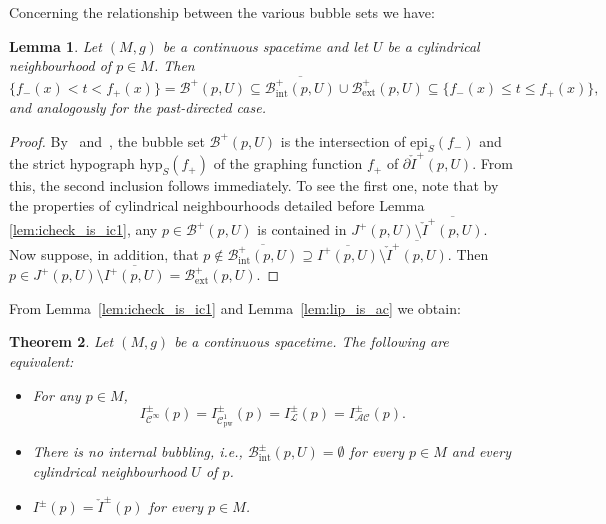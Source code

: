 \documentclass[reqno]{amsart}
\numberwithin{equation}{section}
\theoremstyle{plain}
\newtheorem{theorem}{Theorem}[section]
\newtheorem{lemma}[theorem]{Lemma}
\theoremstyle{definition}
\theoremstyle{remark}
\renewcommand\le{\leqslant}
\newcommand{\copw}{\mathcal{C}^1_{\mathrm{pw}}}
\newcommand{\sse}{\subseteq}
\begin{document}
Concerning the relationship between the various bubble sets we have:
\begin{lemma}\label{lem:bubble_inclusions}
Let $(M,g)$ be a continuous spacetime and let $U$ be a cylindrical neighbourhood of $p\in M$. 
Then 
\begin{equation}\label{eq:bubble_inclusion}
\{ f_-(x) < t <  f_+(x) \} = \mathcal{B}^+(p,U) \sse
\overline{\mathcal{B}^+_{\mathrm{int}}(p,U)} \cup \mathcal{B}^+_{\mathrm{ext}}(p,U) \sse \{ f_-(x) \le t \le f_+(x)\},
\end{equation}
and analogously for the past-directed case.
\end{lemma}
\begin{proof} By~\cite[Prop.\ 1.10]{CG:12} and~\cite[Prop.\ 1.21]{CG:12}, the bubble set $\mathcal{B}^+(p,U)$ is the 
intersection of $\mathrm{epi}_S(f_-)$ and the strict hypograph $\mathrm{hyp}_S(f_+)$ of the graphing function 
$f_+$ of $\partial \check I^+(p,U)$. From this, the second inclusion follows immediately. 
To see the first one, note that by the properties of cylindrical neighbourhoods detailed
before Lemma \ref{lem:icheck_is_ic1}, any $p\in \mathcal{B}^+(p,U)$ is contained
in $J^+(p,U)\setminus \overline{\check I^+(p,U)}$. Now suppose, in addition, that $p\not\in \overline{\mathcal{B}^+_{\mathrm{int}}(p,U)} \supseteq \overline{I^+(p,U)}\setminus
\overline{\check I^+(p,U)}$. Then $p\in J^+(p,U)\setminus \overline{I^+(p,U)} = \mathcal{B}^+_{\mathrm{ext}}(p,U)$.
\end{proof}

From Lemma~\ref{lem:icheck_is_ic1} and Lemma~\ref{lem:lip_is_ac} we obtain:
\begin{theorem}\label{thm:all_i_equal_for_causally_plain}
Let $(M,g)$ be a continuous spacetime. The following are equivalent:
\begin{itemize}
\item[(i)] For any $p\in M$, 
\[
I^\pm_{\mathcal{C}^\infty}(p) = I^\pm_{\copw}(p) = I^\pm_{\mathcal{L}}(p) =  I^\pm_{\mathcal{AC}}(p).
\]
\item[(ii)] There is no internal bubbling, i.e., $\mathcal{B}^{\pm}_{\mathrm{int}}(p,U)=\emptyset$ for every $p\in M$ and every 
cylindrical neighbourhood $U$ of $p$.
\item[(iii)] $I^\pm(p)=\check{I}^\pm(p)$ for every $p\in M$.
\end{itemize}
\end{theorem}
\end{document}
